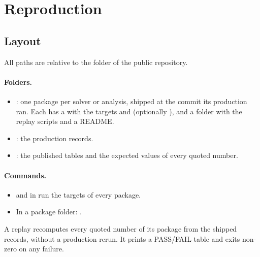 \section{Reproduction}\label{sec:repro}

\subsection{Layout}
All paths are relative to the folder  of the public repository.

\paragraph{Folders.}
\begin{itemize}
\item {}: one package per solver or analysis, shipped at the commit its production ran. Each has
 a  with the targets  and  (optionally ), and a 
 folder with the replay scripts and a README.
\item {}: the production records.
\item {}: the published tables and the expected values of every quoted number.
\end{itemize}

\paragraph{Commands.}
\begin{itemize}
\item {} and  in  run the targets of every package.
\item In a package folder: .
\end{itemize}
A replay recomputes every quoted number of its package from the shipped records, without a production rerun. It
prints a PASS/FAIL table and exits non-zero on any failure.

